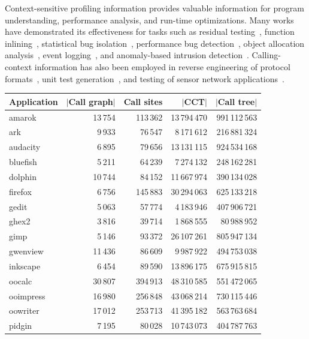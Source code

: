 \noindent Context-sensitive profiling information provides valuable information for program understanding, performance analysis, and run-time optimizations. Many works have demonstrated its effectiveness for tasks such as residual testing~\cite{PavlopoulouY99,Vaswani07}, function inlining~\cite{Chang92}, statistical bug isolation~\cite{Feng03,Liblit03}, performance bug detection~\cite{Nistor13}, object allocation analysis~\cite{Nethercote07}, event logging~\cite{Zhang06}, and anomaly-based intrusion detection~\cite{Bond07}.
Calling-context information has also been employed in reverse engineering of protocol formats~\cite{Lin08}, unit test generation~\cite{Villazon09}, and testing of sensor network applications~\cite{Lai08}.

\begin{table}[ht]
\begin{small}
\ifauthorea{}{\centering}
\begin{tabular}{|l|r r r r|}
\hline
Application & $|$Call graph$|$ & Call sites & $|$CCT$|$ & $|$Call tree$|$\\
\hline
\hline
amarok & 13\,754 & 113\,362 & 13\,794\,470 & 991\,112\,563 \\
ark & 9\,933 & 76\,547 & 8\,171\,612 & 216\,881\,324 \\
audacity & 6\,895 & 79\,656 & 13\,131\,115 & 924\,534\,168 \\
bluefish & 5\,211 & 64\,239 & 7\,274\,132 & 248\,162\,281 \\
dolphin & 10\,744 & 84\,152 & 11\,667\,974 & 390\,134\,028 \\
firefox & 6\,756 & 145\,883 & 30\,294\,063 & 625\,133\,218 \\
gedit & 5\,063 & 57\,774 & 4\,183\,946 & 407\,906\,721 \\
ghex2 & 3\,816 & 39\,714 & 1\,868\,555 & 80\,988\,952 \\
gimp & 5\,146 & 93\,372 & 26\,107\,261 & 805\,947\,134 \\
gwenview & 11\,436 & 86\,609 & 9\,987\,922 & 494\,753\,038 \\
inkscape & 6\,454 & 89\,590 & 13\,896\,175 & 675\,915\,815 \\
oocalc & 30\,807 & 394\,913 & 48\,310\,585 & 551\,472\,065 \\
ooimpress & 16\,980 & 256\,848 & 43\,068\,214 & 730\,115\,446 \\
oowriter & 17\,012 & 253\,713 & 41\,395\,182 & 563\,763\,684 \\
pidgin & 7\,195 & 80\,028 & 10\,743\,073 & 404\,787\,763 \\

\end{tabular}
\end{small}
\end{table}
